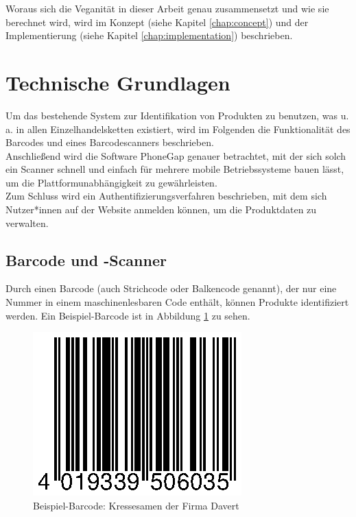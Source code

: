 Woraus sich die Veganität in dieser Arbeit genau zusammensetzt und wie
sie berechnet wird, wird im Konzept (siehe Kapitel \ref{chap:concept}) und der
Implementierung (siehe Kapitel \ref{chap:implementation}) beschrieben.

\section{Technische Grundlagen}

Um das bestehende System zur Identifikation von Produkten zu benutzen,
was u.\,a. in allen Einzelhandelsketten existiert, wird im Folgenden die
Funktionalität des Barcodes und eines Barcodescanners beschrieben.\\
Anschließend wird die Software PhoneGap genauer betrachtet, mit der
sich solch ein Scanner schnell und einfach für mehrere mobile Betriebssysteme bauen
lässt, um die Plattformunabhängigkeit zu gewährleisten.\\
Zum Schluss wird ein Authentifizierungsverfahren beschrieben, mit dem sich
Nutzer*innen auf der Website anmelden können, um die Produktdaten zu
verwalten.

\subsection{Barcode und -Scanner}
\label{sec:barcode}

Durch einen Barcode (auch Strichcode oder Balkencode genannt), der nur
eine Nummer in einem maschinenlesbaren Code enthält, können
Produkte identifiziert werden. Ein Beispiel-Barcode ist in Abbildung
\ref{img:4019339506035} zu sehen.

\begin{figure}[ht]
	\centering
	\includegraphics{pics/4019339506035.eps}
	\caption{Beispiel-Barcode: Kressesamen der Firma Davert}
	\label{img:4019339506035}
\end{figure}

